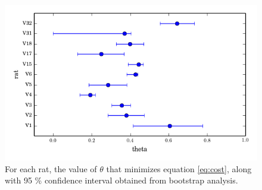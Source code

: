 \documentclass[twocolumn, prX]{revtex4}
\begin{document}
\begin{figure}
\begin{center}
\includegraphics[width=\columnwidth]{theta_error_95.png}
\caption{\label{fig:theta_error}For each rat, the value of $\theta$ that minimizes equation \ref{eq:cost}, along with 95 \% confidence interval obtained from bootstrap analysis.} \end{center}
\end{figure}


\end{document}
